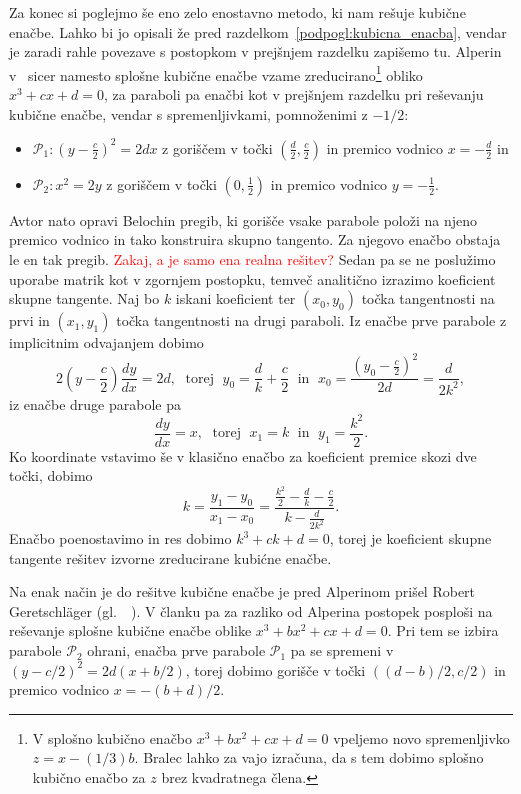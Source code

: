 Za konec si poglejmo še eno zelo enostavno metodo, ki nam rešuje kubične enačbe. Lahko bi jo opisali že pred razdelkom~\ref{podpogl:kubicna_enacba}, vendar je zaradi rahle povezave s postopkom v prejšnjem razdelku zapišemo tu. Alperin v~\cite[str.\ 129]{alperin2000} sicer namesto splošne kubične enačbe vzame zreducirano\footnote{V splošno kubično enačbo $x^3 + bx^2 + cx + d = 0$ vpeljemo novo spremenljivko $z = x - (1/3)b$. Bralec lahko za vajo izračuna, da s tem dobimo splošno kubično enačbo za $z$ brez kvadratnega člena.} obliko $x^3 + cx + d = 0$, za paraboli pa enačbi kot v prejšnjem razdelku pri reševanju kubične enačbe, vendar s spremenljivkami, pomnoženimi z $-1/2$:
\begin{itemize}
    \item $\mathcal{P}_1: \left(y - \frac{c}{2}\right)^2 = 2dx$ z goriščem v točki $(\frac{d}{2}, \frac{c}{2})$ in premico vodnico $x = -\frac{d}{2}$ in
    \item $\mathcal{P}_2:  x^2 = 2y$ z goriščem v točki $(0, \frac{1}{2})$ in premico vodnico $y = -\frac{1}{2}$.
\end{itemize}
Avtor nato opravi Belochin pregib, ki gorišče vsake parabole položi na njeno premico vodnico in tako konstruira skupno tangento. Za njegovo enačbo obstaja le en tak pregib. \textcolor{red}{Zakaj, a je samo ena realna rešitev?}
Sedan pa se ne poslužimo uporabe matrik kot v zgornjem postopku, temveč analitično izrazimo koeficient skupne tangente. Naj bo $k$ iskani koeficient ter $(x_0, y_0)$ točka tangentnosti na prvi in $(x_1, y_1)$ točka tangentnosti na drugi paraboli. Iz enačbe prve parabole z implicitnim odvajanjem dobimo
$$ 2\left(y - \frac{c}{2}\right) \frac{dy}{dx} = 2d, \; \text{ torej } \; y_0 = \frac{d}{k} + \frac{c}{2} \; \text{ in } \; x_0 = \frac{\left(y_0 - \frac{c}{2}\right)^2}{2d} = \frac{d}{2k^2},$$
iz enačbe druge parabole pa
$$ \frac{dy}{dx} = x, \; \text{ torej } \; x_1 = k \; \text{ in } \; y_1 = \frac{k^2}{2}. $$
Ko koordinate vstavimo še v klasično enačbo za koeficient premice skozi dve točki, dobimo
$$ k = \frac{y_1 - y_0}{x_1 - x_0} = \frac{\frac{k^2}{2} - \frac{d}{k} - \frac{c}{2}}{k - \frac{d}{2k^2}}.
$$
Enačbo poenostavimo in res dobimo $k^3 + ck + d = 0$, torej je koeficient skupne tangente rešitev izvorne zreducirane kubićne enačbe.

\begin{opomba}
    Na enak način je do rešitve kubične enačbe je pred Alperinom prišel Robert Geretschläger (gl.\ ~\cite[368--369]{geret1995}). V članku pa za razliko od Alperina postopek posploši na reševanje splošne kubične enačbe oblike $x^3 + bx^2 + cx + d = 0$. Pri tem se izbira parabole $\mathcal{P}_2$ ohrani, enačba prve parabole $\mathcal{P}_1$ pa se spremeni v $(y-c/2)^2 = 2d(x+b/2)$, torej dobimo gorišče v točki $((d-b)/2, c/2)$ in premico vodnico $x = -(b+d)/2$.
\end{opomba}

